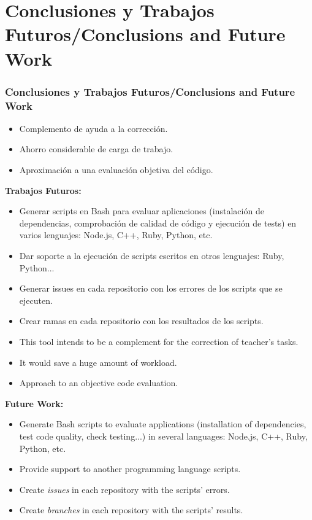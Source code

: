 \documentclass{beamer}
\begin{document}
\section{Conclusiones y Trabajos Futuros/Conclusions and Future Work}
\begin{frame}[allowframebreaks]
  \frametitle{Conclusiones y Trabajos Futuros/Conclusions and Future Work}
  
  \begin{itemize}
    \item Complemento de ayuda a la corrección.
    \item Ahorro considerable de carga de trabajo.
    \item Aproximación a una evaluación objetiva del código.
  \end{itemize}
  \framebreak
  
  {\bf Trabajos Futuros:}
  \begin{itemize}
    \item Generar scripts en Bash para evaluar aplicaciones (instalación de dependencias, comprobación de calidad de código y ejecución de tests) en varios lenguajes: Node.js, C++, Ruby, Python, etc.
    \item Dar soporte a la ejecución de scripts escritos en otros lenguajes: Ruby, Python...
    \item Generar issues en cada repositorio con los errores de los scripts que se ejecuten.
    \item Crear ramas en cada repositorio con los resultados de los scripts.
  \end{itemize}
  \framebreak
  
  \begin{itemize}
    \item This tool intends to be a complement for the correction of teacher's tasks.
    \item It would save a huge amount of workload.
    \item Approach to an objective code evaluation.
  \end{itemize}
  \framebreak
  
  {\bf Future Work:}
  \begin{itemize}
    \item Generate Bash scripts to evaluate applications (installation of dependencies, test code quality, check testing...) in several languages: Node.js, C++, Ruby, Python, etc.
    \item Provide support to another programming language scripts.
    \item Create {\it issues} in each repository with the scripts' errors. 
    \item Create {\it branches} in each repository with the scripts' results.
  \end{itemize}
\end{frame}
\end{document}
